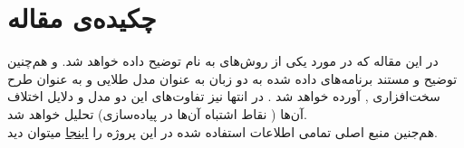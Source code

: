 \chapter*{
چکیده‌ی مقاله
}
\pagestyle{empty}

در این مقاله که در مورد یکی از روش‌های   به نام  توضیح داده خواهد شد. و هم‌چنین توضیح و مستند برنامه‌های داده شده به دو زبان  به عنوان مدل طلایی و  به عنوان طرح سخت‌افزاری , آورده خواهد شد .
در انتها نیز تفاوت‌های این دو مدل و دلایل اختلاف آن‌ها (‌ نقاط اشتباه آن‌ها در پیاده‌سازی) تحلیل خواهد شد.\\
هم‌جنین منبع اصلی تمامی اطلاعات استفاده شده در این پروژه را \href{http://www.skein-hash.info/sites/default/files/skein1.3.pdf}{اینجا} میتوان دید.